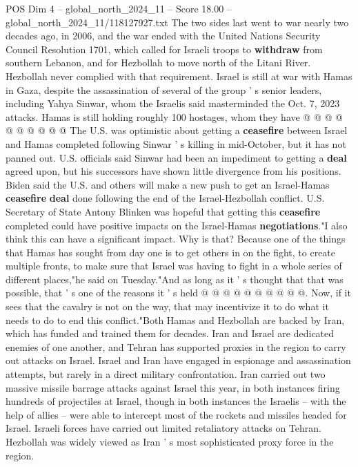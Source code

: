 \begin{textsample}{POS Dim 4 – global\_north\_2024\_11 – Score 18.00 – global\_north\_2024\_11/118127927.txt}
The two sides last went to war nearly two decades ago, in 2006, and the war ended with the United Nations Security Council Resolution 1701, which called for Israeli troops to \textbf{withdraw} from southern Lebanon, and for Hezbollah to move north of the Litani River.
Hezbollah never complied with that requirement.
Israel is still at war with Hamas in Gaza, despite the assassination of several of the group ' s senior leaders, including Yahya Sinwar, whom the Israelis said masterminded the Oct. 7, 2023 attacks.
Hamas is still holding roughly 100 hostages, whom they have @ @ @ @ @ @ @ @ @ @ The U.S. was optimistic about getting a \textbf{ceasefire} between Israel and Hamas completed following Sinwar ' s killing in mid-October, but it has not panned out.
U.S. officials said Sinwar had been an impediment to getting a \textbf{deal} agreed upon, but his successors have shown little divergence from his positions.
Biden said the U.S. and others will make a new push to get an Israel-Hamas \textbf{ceasefire} \textbf{deal} done following the end of the Israel-Hezbollah conflict.
U.S.
Secretary of State Antony Blinken was hopeful that getting this \textbf{ceasefire} completed could have positive impacts on the Israel-Hamas \textbf{negotiations}."I also think this can have a significant impact.
Why is that?
Because one of the things that Hamas has sought from day one is to get others in on the fight, to create multiple fronts, to make sure that Israel was having to fight in a whole series of different places,"he said on Tuesday."And as long as it ' s thought that that was possible, that ' s one of the reasons it ' s held @ @ @ @ @ @ @ @ @ @.
Now, if it sees that the cavalry is not on the way, that may incentivize it to do what it needs to do to end this conflict."Both Hamas and Hezbollah are backed by Iran, which has funded and trained them for decades.
Iran and Israel are dedicated enemies of one another, and Tehran has supported proxies in the region to carry out attacks on Israel.
Israel and Iran have engaged in espionage and assassination attempts, but rarely in a direct military confrontation.
Iran carried out two massive missile barrage attacks against Israel this year, in both instances firing hundreds of projectiles at Israel, though in both instances the Israelis -- with the help of allies -- were able to intercept most of the rockets and missiles headed for Israel.
Israeli forces have carried out limited retaliatory attacks on Tehran.
Hezbollah was widely viewed as Iran ' s most sophisticated proxy force in the region.

\end{textsample}
